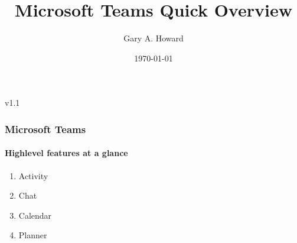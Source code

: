 \documentclass[compress, 10pt]{beamer}
\title{Microsoft Teams Quick Overview}
\date{\today}
\author{Gary A. Howard}
\begin{document}

\begin{frame}%
  \titlepage%
  \begin{center}%
    \textcolor{HavasuBlue}{v1.1}%
  \end{center}%
\end{frame}%


\begin{frame}%
  \frametitle{\hspace{4mm}Microsoft Teams}%
  \framesubtitle{\hspace{4mm}Highlevel features at a glance}%
  \begin{enumerate}%
    \item Activity%
    \item Chat%
    \item Calendar%
    \item Planner%
  \end{enumerate}%
\end{frame}%

\end{document}
